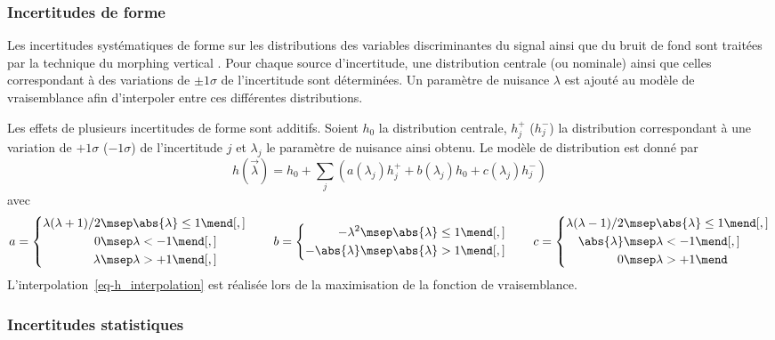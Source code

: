 \subsubsection{Incertitudes de forme}
Les incertitudes systématiques de forme sur les distributions des variables discriminantes du signal ainsi que du bruit de fond sont traitées par la technique du \og morphing vertical \fg.
Pour chaque source d'incertitude, une distribution centrale (ou nominale) ainsi que celles correspondant à des variations de $\pm1\sigma$ de l'incertitude sont déterminées.
Un paramètre de nuisance $\lambda$ est ajouté au modèle de vraisemblance afin d'interpoler entre ces différentes distributions.
\par
Les effets de plusieurs incertitudes de forme sont additifs.
Soient
$h_0$ la distribution centrale,
$h_j^+$ ($h_j^-$) la distribution correspondant à une variation de $+1\sigma$ ($-1\sigma$) de l'incertitude $j$ et
$\lambda_j$ le paramètre de nuisance ainsi obtenu.
Le modèle de distribution est donné par
\begin{equation}
h(\vec{\lambda}) = h_0 + \sum_j \left( a(\lambda_j)h_j^+ + b(\lambda_j) h_0 + c(\lambda_j)h_j^- \right)
\label{eq-h_interpolation}
\end{equation}
avec
\begin{equation}
a = \left\lbrace
\begin{aligned}
\lambda(\lambda+1)/2 &\msep \abs{\lambda}\leq1 \mend[,] \\
0 &\msep \lambda<-1 \mend[,] \\
\lambda &\msep \lambda>+1 \mend[,]
\end{aligned}
\right.
\qquad
b = \left\lbrace
\begin{aligned}
-\lambda^2 &\msep \abs{\lambda}\leq1 \mend[,] \\
-\abs{\lambda} &\msep \abs{\lambda}>1 \mend[,]
\end{aligned}
\right.
\qquad
c = \left\lbrace
\begin{aligned}
\lambda(\lambda-1)/2 &\msep \abs{\lambda}\leq1 \mend[,] \\
\abs{\lambda} &\msep \lambda<-1 \mend[,] \\
0 &\msep \lambda>+1 \mend
\end{aligned}
\right.
\end{equation}
L'interpolation~\eqref{eq-h_interpolation} est réalisée lors de la maximisation de la fonction de vraisemblance.
\subsubsection{Incertitudes statistiques}
